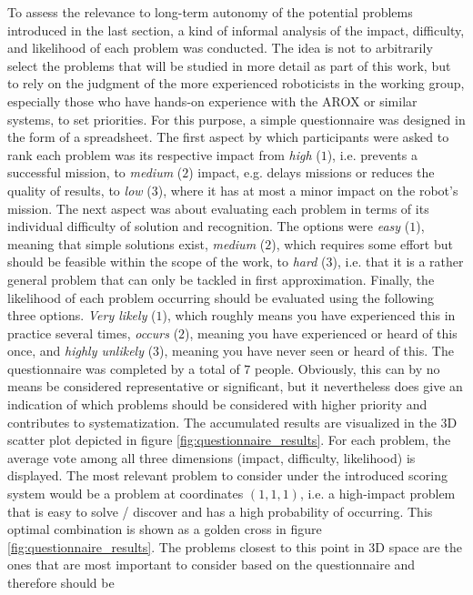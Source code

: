 \documentclass[english, master, utf8]{base/thesis_KBS}
\begin{document}
To assess the relevance to long-term autonomy of the potential problems introduced in the last section, a kind of informal analysis of the impact, 
difficulty, and likelihood of each problem was conducted. The idea is not to arbitrarily select the problems that will be studied in more detail as part
of this work, but to rely on the judgment of the more experienced roboticists in the working group, especially those who have hands-on experience with the
AROX or similar systems, to set priorities. For this purpose, a simple questionnaire was designed in the form of a spreadsheet. The first aspect by which participants 
were asked to rank each problem was its respective impact from \textit{high} ($1$), i.e. prevents a successful mission, to \textit{medium} ($2$) impact, e.g. delays missions 
or reduces the quality of results, to \textit{low} ($3$), where it has at most a minor impact on the robot's mission. The next aspect was about evaluating each problem in 
terms of its individual difficulty of solution and recognition. The options were \textit{easy} ($1$), meaning that simple solutions exist, \textit{medium} ($2$), which 
requires some effort but should be feasible within the scope of the work, to \textit{hard} ($3$), i.e. that it is a rather general problem that can only be tackled in first 
approximation. Finally, the likelihood of each problem occurring should be evaluated using the following three options. \textit{Very likely} ($1$), which roughly means you
have experienced this in practice several times, \textit{occurs} ($2$), meaning you have experienced or heard of this once, and \textit{highly unlikely} ($3$), meaning 
you have never seen or heard of this. The questionnaire was completed by a total of $7$ people. Obviously, this can by no means be considered representative or significant, but it 
nevertheless does give an indication of which problems should be considered with higher priority and contributes to systematization. The accumulated results are visualized in the
3D scatter plot depicted in figure \ref{fig:questionnaire_results}. For each problem, the average vote among all three dimensions (impact, difficulty, likelihood) is displayed.
The most relevant problem to consider under the introduced scoring system would be a problem at coordinates $(1, 1, 1)$, i.e. a high-impact problem 
that is easy to solve / discover and has a high probability of occurring. This optimal combination is shown as a golden cross in figure \ref{fig:questionnaire_results}.
The problems closest to this point in 3D space are the ones that are most important to consider based on the questionnaire and therefore should be 
\end{document}
